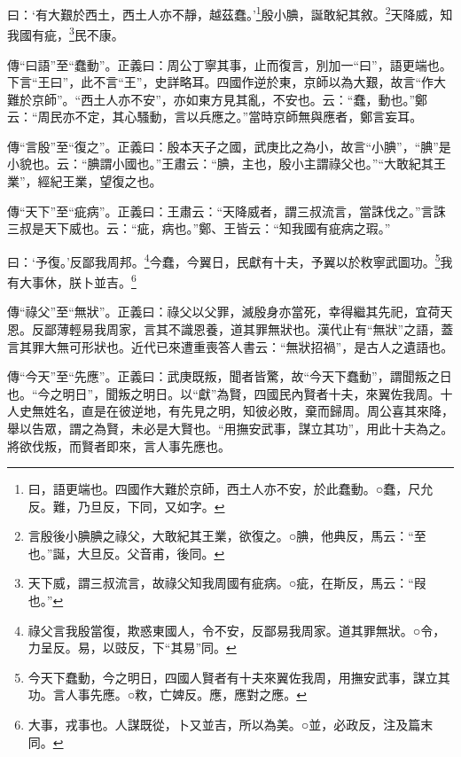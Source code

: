 曰：‘有大艱於西土，西土人亦不靜，越茲蠢。’\footnote{曰，語更端也。四國作大難於京師，西土人亦不安，於此蠢動。○蠢，尺允反。難，乃旦反，下同，又如字。}殷小腆，誕敢紀其敘。\footnote{言殷後小腆腆之祿父，大敢紀其王業，欲復之。○腆，他典反，馬云：“至也。”誕，大旦反。父音甫，後同。}天降威，知我國有疵，\footnote{天下威，謂三叔流言，故祿父知我周國有疵病。○疵，在斯反，馬云：“叚也。”}民不康。


{\noindent\zhuan{}\fzbyks 傳“曰語”至“蠢動”。正義曰：周公丁寧其事，止而復言，別加一“曰”，語更端也。下言“王曰”，此不言“王”，史詳略耳。四國作逆於東，京師以為大艱，故言“作大難於京師”。“西土人亦不安”，亦如東方見其亂，不安也。云：“蠢，動也。”鄭云：“周民亦不定，其心騷動，言以兵應之。”當時京師無與應者，鄭言妄耳。 \par}

{\noindent\zhuan{}\fzbyks 傳“言殷”至“復之”。正義曰：殷本天子之國，武庚比之為小，故言“小腆”，“腆”是小貌也。云：“腆謂小國也。”王肅云：“腆，主也，殷小主謂祿父也。”“大敢紀其王業”，經紀王業，望復之也。 \par}

{\noindent\zhuan{}\fzbyks 傳“天下”至“疵病”。正義曰：王肅云：“天降威者，謂三叔流言，當誅伐之。”言誅三叔是天下威也。云：“疵，病也。”鄭、王皆云：“知我國有疵病之瑕。” \par}

曰：‘予復。’反鄙我周邦。\footnote{祿父言我殷當復，欺惑東國人，令不安，反鄙易我周家。道其罪無狀。○令，力呈反。易，以豉反，下“其易”同。}今蠢，今翼日，民獻有十夫，予翼以於敉寧武圖功。\footnote{今天下蠢動，今之明日，四國人賢者有十夫來翼佐我周，用撫安武事，謀立其功。言人事先應。○敉，亡婢反。應，應對之應。}我有大事休，朕卜並吉。\footnote{大事，戎事也。人謀既從，卜又並吉，所以為美。○並，必政反，注及篇末同。}

{\noindent\zhuan{}\fzbyks 傳“祿父”至“無狀”。正義曰：祿父以父罪，滅殷身亦當死，幸得繼其先祀，宜荷天恩。反鄙薄輕易我周家，言其不識恩養，道其罪無狀也。漢代止有“無狀”之語，蓋言其罪大無可形狀也。近代已來遭重喪答人書云：“無狀招禍”，是古人之遺語也。 \par}

{\noindent\zhuan{}\fzbyks 傳“今天”至“先應”。正義曰：武庚既叛，聞者皆驚，故“今天下蠢動”，謂聞叛之日也。“今之明日”，聞叛之明日。以“獻”為賢，四國民內賢者十夫，來翼佐我周。十人史無姓名，直是在彼逆地，有先見之明，知彼必敗，棄而歸周。周公喜其來降，舉以告眾，謂之為賢，未必是大賢也。“用撫安武事，謀立其功”，用此十夫為之。將欲伐叛，而賢者即來，言人事先應也。 \par}

